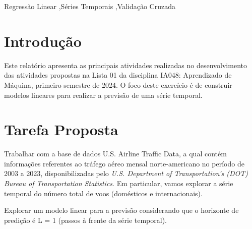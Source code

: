 \documentclass[final,5p]{elsarticle}
\numberwithin{equation}{section}
\begin{document}
\begin{frontmatter}

\begin{keyword}
    Regressão Linear \sep Séries Temporais \sep Validação Cruzada



\end{keyword}

\end{frontmatter}

\section{Introdução}

    Este relatório apresenta as principais atividades realizadas no desenvolvimento das atividades propostas na Lista 01 da disciplina IA048: Aprendizado de Máquina, primeiro semestre de 2024. O foco deste exercício é de construir modelos lineares para realizar a previsão de uma série temporal.

\section{Tarefa Proposta}

    Trabalhar com a base de dados U.S. Airline Traffic Data, a qual contém informações referentes ao tráfego aéreo mensal norte-americano no período de 2003 a 2023, disponibilizadas pelo \emph{U.S. Department of Transportation’s (DOT) Bureau of Transportation Statistics}. Em particular, vamos explorar a série temporal do número total de voos (domésticos e internacionais).

    Explorar um modelo linear para a previsão considerando que o horizonte de predição é L = 1 (passos à frente da série temporal).
\end{document}
